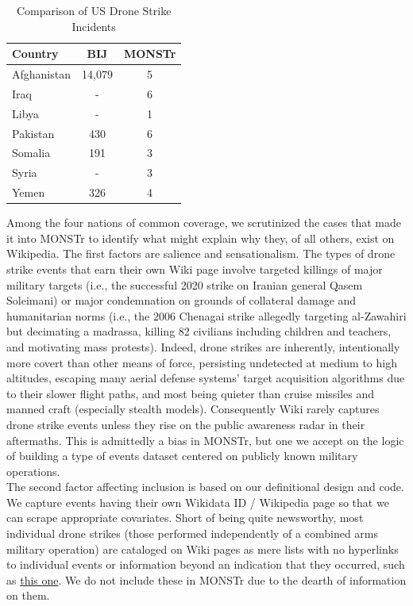 \documentclass[fleqn,12pt]{article}
\begin{document}
\begin{table}
    \caption{Comparison of US Drone Strike Incidents}
    \label{tbl:drones}
    \centering
    \begin{tabular}[h]{|lcc|}
    \hline
    \textbf{Country} & \textbf{BIJ} & \textbf{MONSTr} \\
    \hline
        Afghanistan & 14,079 & 5 \\
        Iraq & - & 6 \\
        Libya & - & 1 \\
        Pakistan & 430 & 6 \\
        Somalia & 191 & 3 \\
        Syria & - & 3 \\
        Yemen & 326 & 4 \\
    \hline
    \end{tabular}
\end{table}

Among the four nations of common coverage, we scrutinized the cases that made it into MONSTr to identify what might explain why they, of all others, exist on Wikipedia. The first factors are salience and sensationalism. The types of drone strike events that earn their own Wiki page involve targeted killings of major military targets (i.e., the successful 2020 strike on Iranian general Qasem Soleimani) or major condemnation on grounds of collateral damage and humanitarian norms (i.e., the 2006 Chenagai strike allegedly targeting al-Zawahiri but decimating a madrassa, killing 82 civilians including children and teachers, and motivating mass protests). Indeed, drone strikes are inherently, intentionally more covert than other means of force, persisting undetected at medium to high altitudes, escaping many aerial defense systems' target acquisition algorithms due to their slower flight paths, and most being quieter than cruise missiles and manned craft (especially stealth models). Consequently Wiki rarely captures drone strike events unless they rise on the public awareness radar in their aftermaths. This is admittedly a bias in MONSTr, but one we accept on the logic of building a type of events dataset centered on publicly known military operations. \\

The second factor affecting inclusion is based on our definitional design and code. We capture events having their own Wikidata ID / Wikipedia page so that we can scrape appropriate covariates. Short of being quite newsworthy, most individual drone strikes (those performed independently of a combined arms military operation) are cataloged on Wiki pages as mere lists with no hyperlinks to individual events or information beyond an indication that they occurred, such as \href{https://en.wikipedia.org/wiki/List_of_drone_strikes_in_Afghanistan}{this one}. We do not include these in MONSTr due to the dearth of information on them.
\end{document}
